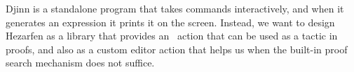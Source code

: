 Djinn is a standalone program that takes commands
interactively, and when it generates an expression it prints it on the screen.
Instead, we want to design Hezarfen as a library that provides an \Elab\ action
that can be used as a tactic in proofs, and also as a custom editor action that
helps us when the built-in proof search mechanism does not suffice.








